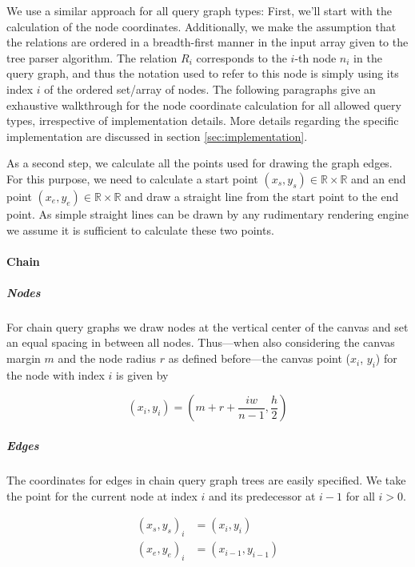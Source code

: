 We use a similar approach for all query graph types: First, we'll start with the calculation of the node coordinates. Additionally, we make the assumption that the relations are ordered in a breadth-first manner in the input array given to the tree parser algorithm. The relation $R_i$ corresponds to the $i$-th node $n_i$ in the query graph, and thus the notation used to refer to this node is simply using its index $i$ of the ordered set/array of nodes. The following paragraphs give an exhaustive walkthrough for the node coordinate calculation for all allowed query types, irrespective of implementation details. More details regarding the specific implementation are discussed in section \ref{sec:implementation}.

As a second step, we calculate all the points used for drawing the graph edges. For this purpose, we need to calculate a start point $(x_s, y_s) \in \mathbb{R} \times \mathbb{R}$ and an end point $(x_e, y_e) \in \mathbb{R} \times \mathbb{R}$ and draw a straight line from the start point to the end point. As simple straight lines can be drawn by any rudimentary rendering engine we assume it is sufficient to calculate these two points.

\newpage

\paragraph{Chain} 

\subparagraph{Nodes} For chain query graphs we draw nodes at the vertical center of the canvas and set an equal spacing in between all nodes. Thus—when also considering the canvas margin $m$ and the node radius $r$ as defined before—the canvas point ($x_i$, $y_i$) for the node with index $i$ is given by

\begin{equation}
    (x_i, y_i) = (m + r + \frac{i\hat{w}}{n - 1}, \frac{h}{2})
\end{equation}

\subparagraph{Edges}

The coordinates for edges in chain query graph trees are easily specified. We take the point for the current node at index $i$ and its predecessor at $i-1$ for all $i > 0$.

\begin{equation}
    \begin{aligned}
        (x_s, y_s)_i &= (x_i, y_i)\\   
        (x_e, y_e)_i &= (x_{i-1}, y_{i-1})
    \end{aligned}
\end{equation}

